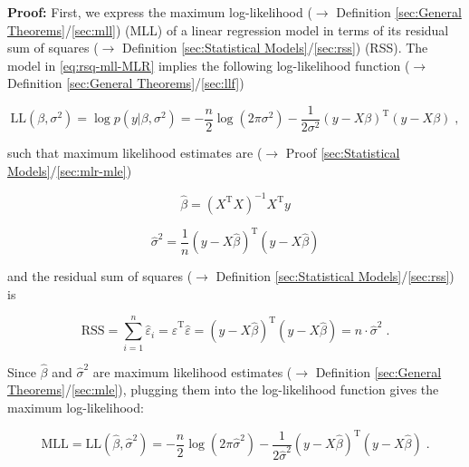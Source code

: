 \documentclass[a4paper,12pt,twoside]{book}
\begin{document}
\vspace{1em}
\textbf{Proof:} First, we express the maximum log-likelihood ($\rightarrow$ Definition \ref{sec:General Theorems}/\ref{sec:mll}) (MLL) of a linear regression model in terms of its residual sum of squares ($\rightarrow$ Definition \ref{sec:Statistical Models}/\ref{sec:rss}) (RSS). The model in \eqref{eq:rsq-mll-MLR} implies the following log-likelihood function ($\rightarrow$ Definition \ref{sec:General Theorems}/\ref{sec:llf})

\begin{equation} \label{eq:rsq-mll-MLR-LL}
\mathrm{LL}(\beta,\sigma^2) = \log p(y|\beta,\sigma^2) = - \frac{n}{2} \log(2\pi\sigma^2) - \frac{1}{2\sigma^2} (y - X\beta)^\mathrm{T} (y - X\beta) \; ,
\end{equation}

such that maximum likelihood estimates are ($\rightarrow$ Proof \ref{sec:Statistical Models}/\ref{sec:mlr-mle})

\begin{equation} \label{eq:rsq-mll-MLR-MLE-beta}
\hat{\beta} = (X^\mathrm{T} X)^{-1} X^\mathrm{T} y
\end{equation}

\begin{equation} \label{eq:rsq-mll-MLR-MLE-sigma2}
\hat{\sigma}^2 = \frac{1}{n} (y - X\hat{\beta})^\mathrm{T} (y - X\hat{\beta})
\end{equation}

and the residual sum of squares ($\rightarrow$ Definition \ref{sec:Statistical Models}/\ref{sec:rss}) is

\begin{equation} \label{eq:rsq-mll-RSS}
\mathrm{RSS} = \sum_{i=1}^n \hat{\varepsilon}_i = \hat{\varepsilon}^\mathrm{T} \hat{\varepsilon} = (y - X\hat{\beta})^\mathrm{T} (y - X\hat{\beta}) = n \cdot \hat{\sigma}^2 \; .
\end{equation}

Since $\hat{\beta}$ and $\hat{\sigma}^2$ are maximum likelihood estimates ($\rightarrow$ Definition \ref{sec:General Theorems}/\ref{sec:mle}), plugging them into the log-likelihood function gives the maximum log-likelihood:

\begin{equation} \label{eq:rsq-mll-MLR-MLL}
\mathrm{MLL} = \mathrm{LL}(\hat{\beta},\hat{\sigma}^2) = - \frac{n}{2} \log(2\pi\hat{\sigma}^2) - \frac{1}{2\hat{\sigma}^2} (y - X\hat{\beta})^\mathrm{T} (y - X\hat{\beta}) \; .
\end{equation}
\end{document}
